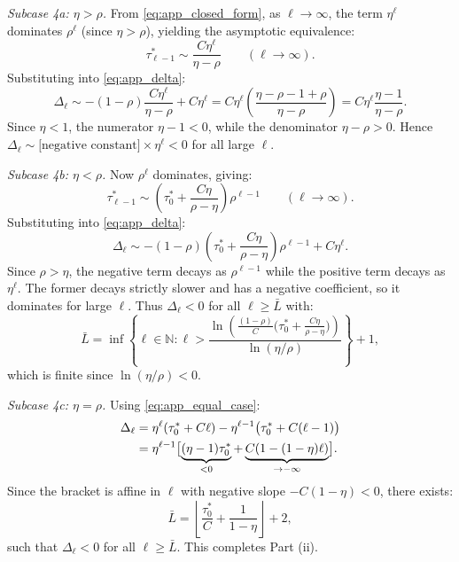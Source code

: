 \textit{Subcase 4a: $\eta > \rho$.} From \eqref{eq:app_closed_form}, as $\ell \to \infty$, the term $\eta^{\ell}$ dominates $\rho^{\ell}$ (since $\eta > \rho$), yielding the asymptotic equivalence:
\begin{equation}
\tau^{*}_{\ell-1} \sim \frac{C\eta^{\ell}}{\eta - \rho} \qquad (\ell \to \infty).
\end{equation}
Substituting into \eqref{eq:app_delta}:
\begin{equation}
\Delta_{\ell} \sim -(1-\rho)\frac{C\eta^{\ell}}{\eta-\rho} + C\eta^{\ell}
= C\eta^{\ell}\left(\frac{\eta - \rho - 1 + \rho}{\eta - \rho}\right)
= C\eta^{\ell}\frac{\eta - 1}{\eta - \rho}.
\end{equation}
Since $\eta < 1$, the numerator $\eta - 1 < 0$, while the denominator $\eta - \rho > 0$. Hence $\Delta_{\ell} \sim \text{[negative constant]} \times \eta^{\ell} < 0$ for all large $\ell$.

\textit{Subcase 4b: $\eta < \rho$.} Now $\rho^{\ell}$ dominates, giving:
\begin{equation}
\tau^{*}_{\ell-1} \sim \left(\tau^{*}_{0} + \frac{C\eta}{\rho - \eta}\right)\rho^{\ell-1} \qquad (\ell \to \infty).
\end{equation}
Substituting into \eqref{eq:app_delta}:
\begin{equation}
\Delta_{\ell} \sim -(1-\rho)\left(\tau^{*}_{0} + \frac{C\eta}{\rho-\eta}\right)\rho^{\ell-1} + C\eta^{\ell}.
\end{equation}
Since $\rho > \eta$, the negative term decays as $\rho^{\ell-1}$ while the positive term decays as $\eta^{\ell}$. The former decays strictly slower and has a negative coefficient, so it dominates for large $\ell$. Thus $\Delta_{\ell} < 0$ for all $\ell \geq \bar{L}$ with:
\begin{equation}
\bar{L} = \inf\left\{\ell \in \mathbb{N} : \ell > \frac{\ln\!\left(\frac{(1-\rho)}{C}\bigl(\tau^{*}_{0} + \frac{C\eta}{\rho-\eta}\bigr)\right)}{\ln(\eta/\rho)}\right\} + 1,
\end{equation}
which is finite since $\ln(\eta/\rho) < 0$.

\textit{Subcase 4c: $\eta = \rho$.} Using \eqref{eq:app_equal_case}:
\begin{align}
\Delta_{\ell} &= \eta^{\ell}(\tau^{*}_{0} + C\ell) - \eta^{\ell-1}\bigl(\tau^{*}_{0} + C(\ell-1)\bigr) \notag \\
&= \eta^{\ell-1}\bigl[\underbrace{(\eta-1)\tau^{*}_{0}}_{< 0} + \underbrace{C(1 - (1-\eta)\ell)}_{\to -\infty}\bigr].
\end{align}
Since the bracket is affine in $\ell$ with negative slope $-C(1-\eta) < 0$, there exists:
\begin{equation}
\bar{L} = \left\lfloor\frac{\tau^{*}_{0}}{C} + \frac{1}{1-\eta}\right\rfloor + 2,
\end{equation}
such that $\Delta_{\ell} < 0$ for all $\ell \geq \bar{L}$. This completes Part (ii).

